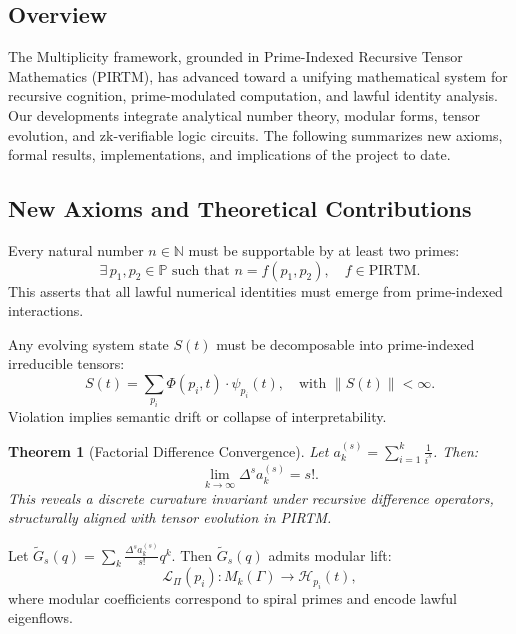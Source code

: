 \documentclass[12]{amsart}
\theoremstyle{plain}
\newtheorem{theorem}{Theorem}[section]
\begin{document}
\subsection{Overview}
The Multiplicity framework, grounded in Prime-Indexed Recursive Tensor Mathematics (PIRTM), has advanced toward a unifying mathematical system for recursive cognition, prime-modulated computation, and lawful identity analysis. Our developments integrate analytical number theory, modular forms, tensor evolution, and zk-verifiable logic circuits. The following summarizes new axioms, formal results, implementations, and implications of the project to date.

\subsection{New Axioms and Theoretical Contributions}

\begin{axiom}
Every natural number $n \in \mathbb{N}$ must be supportable by at least two primes: 
\[
\exists\, p_1, p_2 \in \mathbb{P} \text{ such that } n = f(p_1, p_2), \quad f \in \text{PIRTM}.
\]
This asserts that all lawful numerical identities must emerge from prime-indexed interactions.
\end{axiom}

\begin{axiom}
Any evolving system state $S(t)$ must be decomposable into prime-indexed irreducible tensors:
\[
S(t) = \sum_{p_i} \Phi(p_i, t) \cdot \psi_{p_i}(t), \quad \text{with } \|S(t)\| < \infty.
\]
Violation implies semantic drift or collapse of interpretability.
\end{axiom}

\begin{theorem}[Factorial Difference Convergence]
Let $a_k^{(s)} = \sum_{i=1}^k \frac{1}{i^s}$. Then:
\[
\lim_{k \to \infty} \Delta^s a_k^{(s)} = s!.
\]
This reveals a discrete curvature invariant under recursive difference operators, structurally aligned with tensor evolution in PIRTM.
\end{theorem}

\begin{conjecture}
Let $\widetilde{G}_s(q) = \sum_k \frac{\Delta^s a_k^{(s)}}{s!} q^k$. Then $\widetilde{G}_s(q)$ admits modular lift:
\[
\mathcal{L}_\Pi(p_i) : M_k(\Gamma) \rightarrow \mathcal{H}_{p_i}(t),
\]
where modular coefficients correspond to spiral primes and encode lawful eigenflows.
\end{conjecture}
\end{document}
